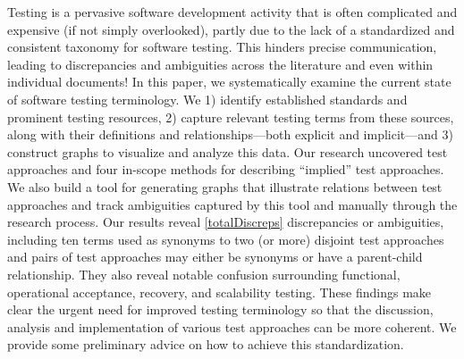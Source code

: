 \label{abstract}%
Testing is a pervasive software development activity that is often
complicated and expensive (if not simply overlooked), partly due to
the lack of a standardized and consistent taxonomy for software testing.
This hinders precise communication, leading to discrepancies and
ambiguities across the literature and even within individual documents!
In this paper, we systematically examine the current state of software
testing terminology. We 1) identify established standards
and prominent testing resources, 2) capture relevant testing terms
from these sources, along with their definitions and relationships---both
explicit and implicit---and 3) construct graphs to visualize and analyze
this data. Our research uncovered \approachCount{} test approaches and
four in-scope methods for describing ``implied'' test approaches. We also build
a tool for generating graphs that illustrate relations between test
approaches and track ambiguities captured by this tool and manually through
the research process. Our results reveal \ref*{totalDiscreps} discrepancies
or ambiguities, including ten terms used as synonyms to two (or more)
disjoint test approaches and \parSynCount{} pairs of test approaches may
either be synonyms or have a parent-child relationship. They also reveal
notable confusion surrounding functional, operational acceptance, recovery,
and scalability testing. These findings make clear
the urgent need for improved testing terminology so that the discussion,
analysis and implementation of various test approaches can be more coherent.
We provide some preliminary advice on how to achieve this standardization.